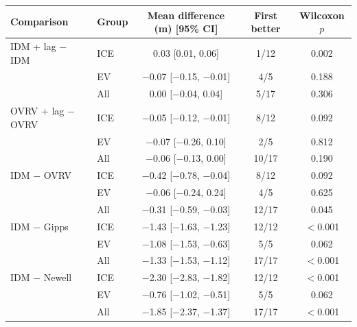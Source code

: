 \begin{tabular}{llccc}
\toprule
Comparison & Group & Mean difference (m) [95\% CI] & First better & Wilcoxon $p$ \\
\midrule
IDM + lag $-$ IDM & ICE & 0.03 [0.01, 0.06] & 1/12 & 0.002 \\
 & EV & $-$0.07 [$-$0.15, $-$0.01] & 4/5 & 0.188 \\
 & All & 0.00 [$-$0.04, 0.04] & 5/17 & 0.306 \\
\addlinespace
OVRV + lag $-$ OVRV & ICE & $-$0.05 [$-$0.12, $-$0.01] & 8/12 & 0.092 \\
 & EV & $-$0.07 [$-$0.26, 0.10] & 2/5 & 0.812 \\
 & All & $-$0.06 [$-$0.13, 0.00] & 10/17 & 0.190 \\
\addlinespace
IDM $-$ OVRV & ICE & $-$0.42 [$-$0.78, $-$0.04] & 8/12 & 0.092 \\
 & EV & $-$0.06 [$-$0.24, 0.24] & 4/5 & 0.625 \\
 & All & $-$0.31 [$-$0.59, $-$0.03] & 12/17 & 0.045 \\
\addlinespace
IDM $-$ Gipps & ICE & $-$1.43 [$-$1.63, $-$1.23] & 12/12 & $<$0.001 \\
 & EV & $-$1.08 [$-$1.53, $-$0.63] & 5/5 & 0.062 \\
 & All & $-$1.33 [$-$1.53, $-$1.12] & 17/17 & $<$0.001 \\
\addlinespace
IDM $-$ Newell & ICE & $-$2.30 [$-$2.83, $-$1.82] & 12/12 & $<$0.001 \\
 & EV & $-$0.76 [$-$1.02, $-$0.51] & 5/5 & 0.062 \\
 & All & $-$1.85 [$-$2.37, $-$1.37] & 17/17 & $<$0.001 \\
\bottomrule
\end{tabular}
